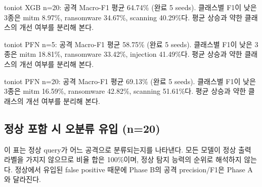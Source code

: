 toniot XGB n=\allowbreak{}20: 공격 Macro-F1 평균 64.74\% (완료 5 seeds). 클래스별 F1이 낮은 3종은 mitm 8.97\%, ransomware 34.67\%, scanning 40.29\%다. 평균 상승과 약한 클래스의 개선 여부를 분리해 본다.

toniot PFN n=\allowbreak{}5: 공격 Macro-F1 평균 58.75\% (완료 5 seeds). 클래스별 F1이 낮은 3종은 mitm 18.81\%, ransomware 33.42\%, injection 41.49\%다. 평균 상승과 약한 클래스의 개선 여부를 분리해 본다.

toniot PFN n=\allowbreak{}20: 공격 Macro-F1 평균 69.13\% (완료 5 seeds). 클래스별 F1이 낮은 3종은 mitm 16.59\%, ransomware 42.82\%, scanning 51.61\%다. 평균 상승과 약한 클래스의 개선 여부를 분리해 본다.

\subsection{정상 포함 시 오분류 유입 (n=\allowbreak{}20)}
이 표는 정상 query가 어느 공격으로 분류되는지를 나타낸다. 모든 모델이 정상 출력 라벨을 가지지 않으므로 비율 합은 100\%이며, 정상 탐지 능력의 순위로 해석하지 않는다. 정상에서 유입된 false positive 때문에 Phase B의 공격 precision/\allowbreak{}F1은 Phase A와 달라진다.

